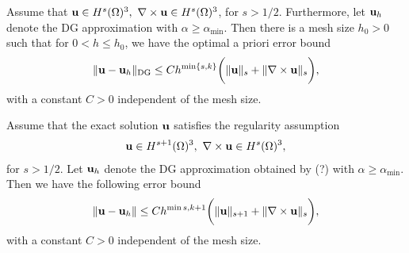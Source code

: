 \documentclass[final,leqno]{siamltex704}
\newcommand{\bn}{{\bf n}}
\def\bn{{\bf n}}
\def\bu{{\bf u}}
\def\bE{{\bf E}}
\def\bB{{\bf B}}
\begin{document}
\begin{theorem}
Assume that $\bu\in H^s(\Omega)^3,\ \nabla\times\bu\in H^s(\Omega)^3$, for $s>1/2$. Furthermore, let $\bu_h$ denote the DG approximation with $\alpha\ge \alpha_{\min}.$ Then there is a mesh size $h_0>0$ such that for $0<h\le h_0$, we have the optimal a priori error bound
\begin{eqnarray}
\|\bu-\bu_h\|_{\text{DG}}\le Ch^{\min\{s,k\}}\bigg(\|\bu\|_s+\|\nabla\times\bu\|_s\bigg),
\end{eqnarray}
with a constant $C>0$ independent of the mesh size.
\end{theorem}

\begin{theorem}
Assume that the exact solution $\bu$ satisfies the regularity assumption
\begin{eqnarray}
\bu\in H^{s+1}(\Omega)^3,\ \nabla\times\bu\in H^s(\Omega)^3,
\end{eqnarray}
for $s>1/2$. Let $\bu_h$ denote the DG approximation obtained by (?) with $\alpha\ge\alpha_{\min}$. Then we have the following error bound
\begin{eqnarray}
\|\bu-\bu_h\|\le Ch^{\min{s,k}+1}\bigg(\|\bu\|_{s+1}+\|\nabla\times\bu\|_s\bigg),
\end{eqnarray}
with a constant $C>0$ independent of the mesh size.
\end{theorem}

%
\end{document}
